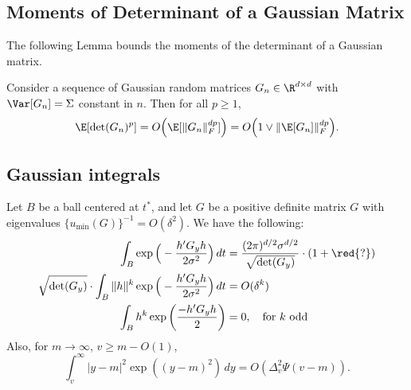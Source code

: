 \documentclass{article}
\newcommand{\ag}[1]{{\bf{{\red{[{AG: #1}]}}}}}
\begin{document}
	\subsection{Moments of Determinant of a Gaussian Matrix}
	The following Lemma bounds the moments of the determinant of a Gaussian matrix. \ag{Needs a proof.}
	\begin{lemma}
		\label{lem:determinant-moments}
		Consider a sequence of Gaussian random matrices $G_n \in \R^{d \times d}$ with $\Var[G_n] = \Sigma$ constant in $n$. Then for all $p \geq 1$,
		\begin{equation*}
			\E[\det(G_n)^{p}] = O\Big(\E[\|G_n\|_F^{dp}]\Big) = O\Big(1 \vee \|\E[G_n]\|_{F}^{dp}\Big).
		\end{equation*} 
	\end{lemma}
	
	\subsection{Gaussian integrals}
	\label{subsec:gaussian-integrals}
	Let $B$ be a ball centered at $t^*$, and let $G$ be a positive definite matrix $G$ with eigenvalues $\{u_{\min}(G)\}^{-1} = O(\delta^2)$. We have the following:
	\begin{equation}
		\label{pf:approximate-joint-distribution-1}
		\begin{aligned}
			\int_{B} \exp\Big(-\frac{h'G_y h}{2\sigma^2}\Big) \,dt & = \frac{(2\pi)^{d/2}\sigma^{d/2}}{\sqrt{\det(G_y)}} \cdot (1 + \red{?}) \\
			\sqrt{\det(G_y)} \cdot \int_{B} \|h\|^k \exp\Big(-\frac{h'G_y h}{2\sigma^2}\Big) \,dt & = O(\delta^{k}) \\
			\int_{B} h^k \exp\bigg(\frac{-h'G_yh}{2}\bigg) & = 0, \quad \textrm{for $k$ odd}
		\end{aligned}
	\end{equation}
	Also, for $m \to \infty$, $v \geq m - O(1)$, 
	\begin{equation}
		\label{pf:approximate-joint-distribution-1.5}
		\int_{v}^{\infty} |y - m|^2\exp((y - m)^2) \,dy = O(\Delta_v^2 \Psi(v - m)).
	\end{equation}
	
\end{document}
